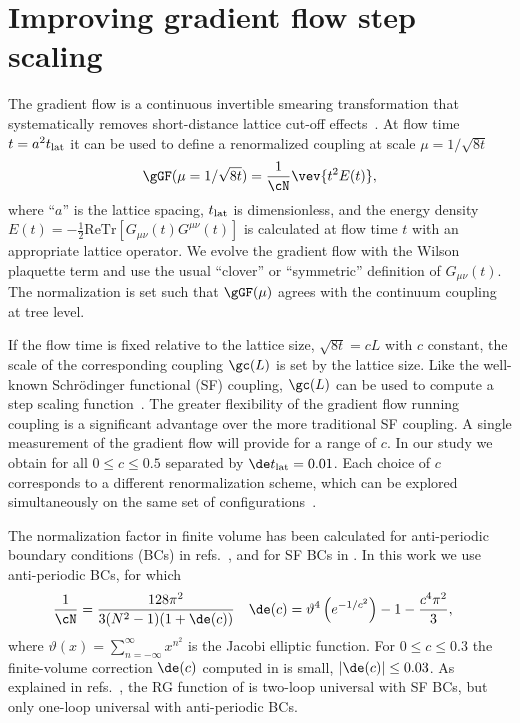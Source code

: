 \section{Improving gradient flow step scaling} %
The gradient flow is a continuous invertible smearing transformation that systematically removes short-distance lattice cut-off effects~\cite{Luscher:2009eq, Luscher:2010iy}.
At flow time $t = a^2 t_{\rm{lat}}$ it can be used to define a renormalized coupling at scale $\mu = 1 / \sqrt{8t}$
\begin{equation}
  \label{eq:def_g2}
  \gGF(\mu = 1 / \sqrt{8t}) = \frac{1}{\cN} \vev{t^2 E(t)},
\end{equation}
where ``$a$'' is the lattice spacing, $t_{\rm{lat}}$ is dimensionless, and the energy density $E(t) = -\frac{1}{2}\mbox{ReTr}\left[G_{\mu\nu}(t) G^{\mu\nu}(t)\right]$ is calculated at flow time $t$ with an appropriate lattice operator.
We evolve the gradient flow with the Wilson plaquette term and use the usual ``clover'' or ``symmetric'' definition of $G_{\mu\nu}(t)$.
The normalization \cN is set such that $\gGF(\mu)$ agrees with the continuum \MSbar coupling at tree level.

If the flow time is fixed relative to the lattice size, $\sqrt{8t} = cL$ with $c$ constant, the scale of the corresponding coupling $\gc(L)$ is set by the lattice size.
Like the well-known Schr\"odinger functional (SF) coupling, $\gc(L)$ can be used to compute a step scaling function~\cite{Fodor:2012td, Fodor:2012qh, Fritzsch:2013je}.
The greater flexibility of the gradient flow running coupling is a significant advantage over the more traditional SF coupling.
A single measurement of the gradient flow will provide \gc for a range of $c$.
In our study we obtain \gc for all $0 \leq c \leq 0.5$ separated by $\de t_{\rm{lat}} = 0.01$.
Each choice of $c$ corresponds to a different renormalization scheme, which can be explored simultaneously on the same set of configurations~\cite{Fritzsch:2013je}.

The normalization factor \cN in finite volume has been calculated for anti-periodic boundary conditions (BCs) in refs.~\cite{Fodor:2012td, Fodor:2012qh}, and for SF BCs in .
In this work we use anti-periodic BCs, for which
\begin{align}
  \frac{1}{\cN} & = \frac{128\pi^2}{3(N^2 - 1)(1 + \de(c))} &
  \de(c) & = \vartheta^4\left(e^{-1 / c^2}\right) - 1 - \frac{c^4 \pi^2}{3},
\end{align}
where $\vartheta(x) = \sum_{n = -\infty}^{\infty} x^{n^2}$ is the Jacobi elliptic function.
For $0 \leq c \leq 0.3$ the finite-volume correction $\de(c)$ computed in  is small, $|\de(c)| \leq 0.03$.
As explained in refs.~\cite{Fodor:2012td, Fodor:2012qh}, the RG \be function of \gGF is two-loop universal with SF BCs, but only one-loop universal with anti-periodic BCs.

